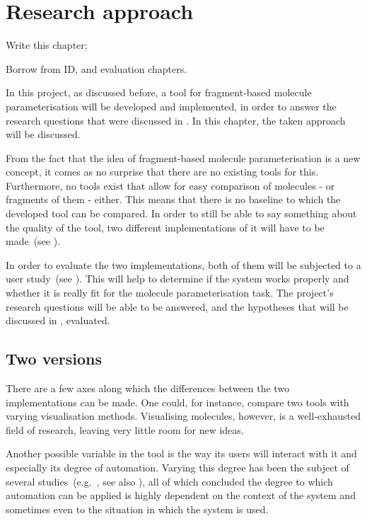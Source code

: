 \chapter{Research approach}

\begin{todo}
\item Write this chapter;
\item Borrow from ID, and evaluation chapters.
\end{todo}

In this project, as discussed before, a tool for fragment-based molecule parameterisation will be developed and implemented, in order to answer the research questions that were discussed in . In this chapter, the taken approach will be discussed. 

From the fact that the idea of fragment-based molecule parameterisation is a new concept, it comes as no surprise that there are no existing tools for this. Furthermore, no tools exist that allow for easy comparison of molecules - or fragments of them - either. This means that there is no baseline to which the developed tool can be compared. In order to still be able to say something about the quality of the tool, two different implementations of it will have to be made~(see ).

In order to evaluate the two implementations, both of them will be subjected to a user study~(see ). This will help to determine if the system works properly and whether it is really fit for the molecule parameterisation task. The project's research questions will be able to be answered, and the hypotheses that will be discussed in , evaluated.


\section{Two versions}
There are a few axes along which the differences between the two implementations can be made. One could, for instance, compare two tools with varying visualisation methods. Visualising molecules, however, is a well-exhausted field of research, leaving very little room for new ideas.

Another possible variable in the tool is the way its users will interact with it and especially its degree of automation. Varying this degree has been the subject of several studies~(e.g.~\cite{payne2000varying, horvitz1999principles, marcus1987taking, norman1990problem}, see also ), all of which concluded the degree to which automation can be applied is highly dependent on the context of the system and sometimes even to the situation in which the system is used.


